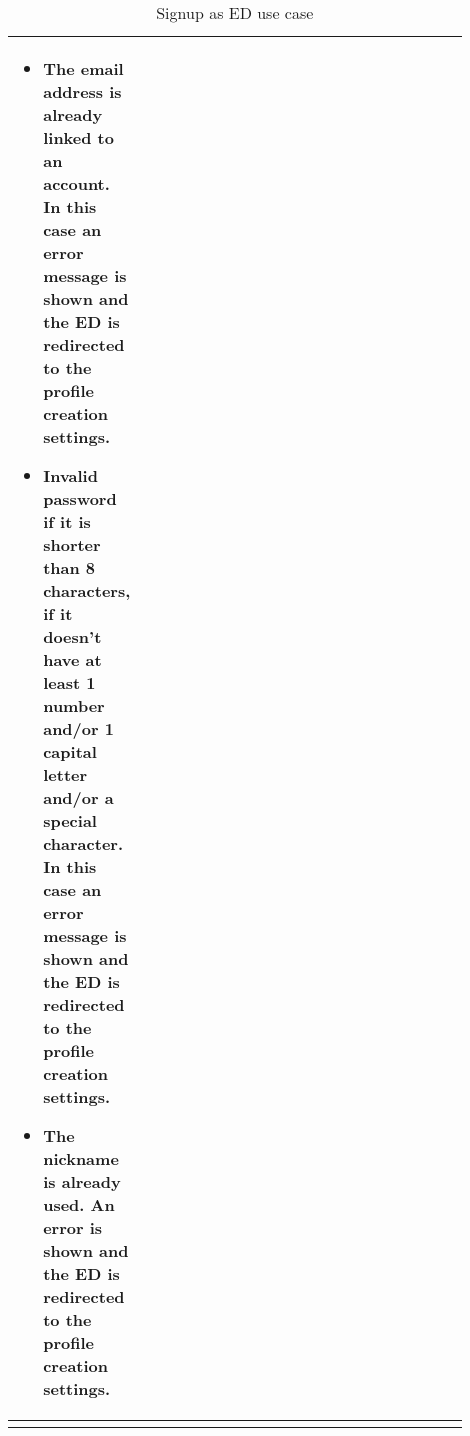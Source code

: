 \begin{center}
\begin{longtable}{|l|p{0.9\linewidth}|}
\begin{itemize}
            \item The email address is already linked to an account. In this case an error message is shown and the ED is redirected to the profile creation settings.
            \item Invalid password if it is shorter than 8 characters, if it doesn’t have at least 1 number and/or 1 capital letter and/or a special character. In this case an error message is shown and the ED is redirected to the profile creation settings.
            \item  The nickname is already used. An error is shown and the ED is redirected to the profile creation settings.
        \end{itemize}  \\
        \hline
        \caption{Signup as ED use case}
        \label{tab: signup_as_ED_use_case}
    \end{longtable}
\end{center}

